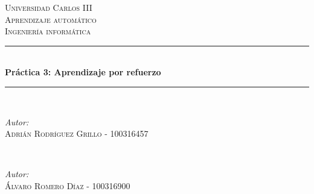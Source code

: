 \documentclass[11pt,a4paper]{article}
\author{Adrián Rodríguez Grillo - 100316457 \\
Álvaro Romero Díaz - 100316900}
\begin{document}
\begin{titlepage}

\newcommand{\HRule}{\rule{\linewidth}{0.5mm}} %

\center %
 

\textsc{\LARGE Universidad Carlos III}\\[1.5cm] %
\textsc{\Large Aprendizaje automático}\\[0.5cm] %
\textsc{\large Ingeniería informática}\\[0.5cm] %


\HRule \\[0.4cm]
{\huge \bfseries Práctica 3: Aprendizaje por refuerzo}\\[0.4cm] %
\HRule \\[1.5cm]
 

\begin{minipage}{0.4\textwidth}
\begin{flushleft} \large
\emph{Autor:}\\
\textsc{Adrián Rodríguez Grillo - 100316457} %
\end{flushleft}
\end{minipage}
~
\begin{minipage}{0.3\textwidth}
\begin{flushright} \large
\emph{Autor:}\\
\textsc{Álvaro Romero Díaz - 100316900}
\end{flushright}
\end{minipage}\\[2cm]



\end{titlepage}
\end{document}
